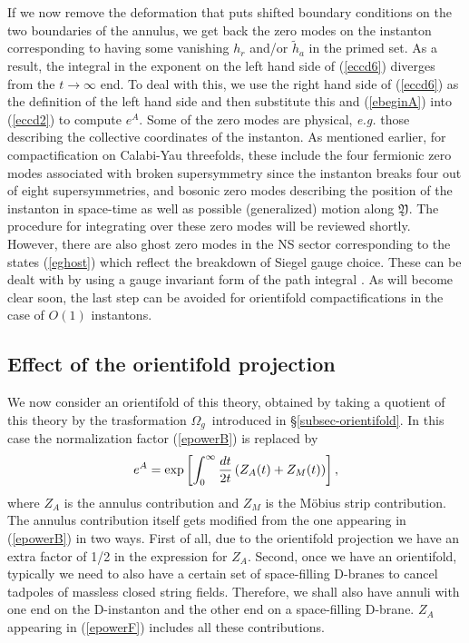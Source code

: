 \documentclass[12pt,a4paper]{article}
\newcommand{\be}{\begin{equation}}
\newcommand{\ee}{\end{equation}}
\newcommand{\refb}[1]{(\ref{#1})}
\def\({\left(}
\def\){\right)}
\def\[{\left[}
\def\]{\right]}
\def\CY{\mathfrak{Y}}
\newcommand{\oo}{{$\Omega_g$}}
\begin{document}
If we now remove the deformation that puts shifted boundary conditions on the two
boundaries of the annulus, we get back the zero modes on the instanton corresponding to having some vanishing
$h_r$ and/or $\tilde h_a$ in the primed set. As a result, the integral in the exponent on
the left hand side of \refb{eccd6} diverges from the $t\to\infty$ end.
To deal with this, we use the right hand side
of \refb{eccd6} as the definition of the left hand side and then substitute this
and \refb{ebeginA} into \refb{eccd2} to compute $e^A$.
Some of the zero modes are physical, {\it e.g.} those
describing the collective coordinates of the instanton.
As mentioned earlier, for compactification on Calabi-Yau threefolds, these
include the four fermionic zero modes
associated with broken supersymmetry since the
instanton breaks four out of eight supersymmetries, and bosonic zero modes describing the
position of the instanton in space-time as well as possible (generalized) motion along $\CY$.
The procedure for integrating over these zero modes will be reviewed shortly.
However, there are also ghost zero modes in the NS sector corresponding to the states \refb{eghost}
which reflect the breakdown of Siegel gauge choice. These can be dealt with by using a
gauge invariant form of the path integral \cite{Sen:2021qdk}. As will become
clear soon, the last step can be avoided for orientifold compactifications in the case of
$O(1)$ instantons.



\subsection{Effect of the orientifold projection}
\label{subsec-effectorient}

We now consider an orientifold of this theory, obtained by taking a quotient of this theory by
the trasformation \oo\ introduced in \S\ref{subsec-orientifold}.
In this case the normalization factor \refb{epowerB} is replaced by
\be\label{epowerF}
e^A=\exp\[\int_0^\infty {dt\over 2t}  \(Z_A(t) + Z_M(t)\)\] ,
\ee
where $Z_A$ is the annulus contribution and $Z_M$ is the M\"{o}bius strip contribution.
The annulus contribution itself gets modified from the one appearing in \refb{epowerB}
in two ways. First of all, due to the orientifold projection we have an extra
factor of 1/2 in the expression for $Z_A$.
Second, once we have an orientifold, typically we need to also have a certain
set of space-filling D-branes to cancel tadpoles of massless closed string fields. Therefore,
we shall also have annuli with one end on the D-instanton and the other end on a space-filling
D-brane. $Z_A$ appearing in \refb{epowerF} includes all these contributions.
\end{document}
